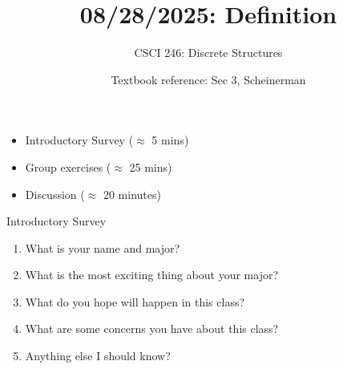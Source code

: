 \documentclass[10pt]{beamer}
\begin{document}




\title{08/28/2025: Definition}
\author{CSCI 246: Discrete Structures}
\date{Textbook reference: Sec 3, Scheinerman}

\begin{frame}
    \titlepage 
\end{frame}

\begin{frame}
\begin{myyellowbox}[title=Today's Agenda]
\begin{itemize}
	\item Introductory Survey ($\approx$ 5 mins)
	\item Group exercises ($\approx$ 25 mins)
	\item Discussion ($\approx$ 20 minutes)
\end{itemize}


\end{myyellowbox}
\vfill 

\end{frame}




\begin{frame}{Introductory Survey}

\begin{enumerate}
	\item What is your name and major?
	\item What is the most exciting thing about your major?
	\item What do you hope will happen in this class?
	\item What are some concerns you have about this class?
	\item Anything else I should know?
\end{enumerate}
	
\end{frame}



%
\end{document}
